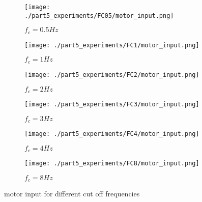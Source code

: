 \begin{figure}[H]
	\centering
	\begin{subfigure}[b]{0.4\textwidth}
		\texttt{[image: ./part5\_experiments/FC05/motor\_input.png]}
		\caption{$f_c=0.5Hz$}
	\end{subfigure}
	\begin{subfigure}[b]{0.4\textwidth}
		\texttt{[image: ./part5\_experiments/FC1/motor\_input.png]}
		\caption{$f_c=1Hz$}
	\end{subfigure}
	\begin{subfigure}[b]{0.4\textwidth}
		\texttt{[image: ./part5\_experiments/FC2/motor\_input.png]}
		\caption{$f_c=2Hz$}
	\end{subfigure}
	\begin{subfigure}[b]{0.4\textwidth}
		\texttt{[image: ./part5\_experiments/FC3/motor\_input.png]}
		\caption{$f_c=3Hz$}
	\end{subfigure}
	\begin{subfigure}[b]{0.4\textwidth}
		\texttt{[image: ./part5\_experiments/FC4/motor\_input.png]}
		\caption{$f_c=4Hz$}
	\end{subfigure}
	\begin{subfigure}[b]{0.4\textwidth}
		\texttt{[image: ./part5\_experiments/FC8/motor\_input.png]}
		\caption{$f_c=8Hz$}
	\end{subfigure}
	\caption{motor input for different cut off frequencies}
	\label{m_o_f}
\end{figure}


